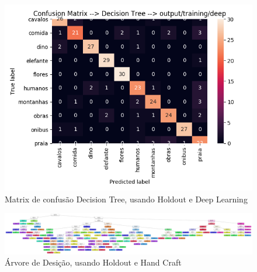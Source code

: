 \documentclass[
article,			%
11pt,				%
oneside,			%
a4paper,			%
english,			%
brazil,				%
sumario=tradicional,
]{abntex2}
\begin{document}
\begin{anexosenv}
	
	\begin{figure}[htb]
		\caption{\label{confusion-matrix-decision-tree-holdout-deep}Matrix de confusão Decision Tree, usando Holdout e Deep Learning}
		\begin{center}
			\includegraphics[scale=0.5]{confusion-matrix-decision-tree-deep.png}
		\end{center}
	\end{figure}
	
	\begin{figure}[htb]
		\caption{\label{decision-tree-holdout-hand-craft}Árvore de Desição, usando Holdout e Hand Craft}
		\begin{center}
			\includegraphics[scale=0.06]{Decision_Tree_Hand_Craft.pdf}
		\end{center}
	\end{figure}
	

\end{anexosenv}
\end{document}
